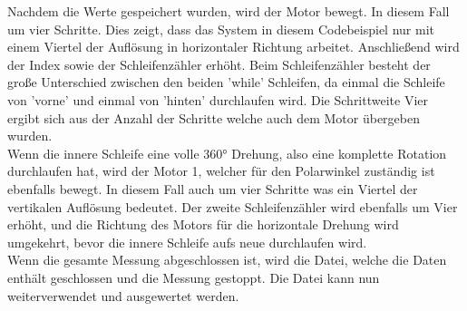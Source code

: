 Nachdem die Werte gespeichert wurden, wird der Motor bewegt. In diesem Fall um vier Schritte. Dies zeigt, dass das System in diesem Codebeispiel nur mit einem Viertel der Auflösung in horizontaler Richtung arbeitet. Anschließend wird der Index sowie der Schleifenzähler erhöht. Beim Schleifenzähler besteht der große Unterschied zwischen den beiden 'while' Schleifen, da einmal die Schleife von 'vorne' und einmal von 'hinten' durchlaufen wird. Die Schrittweite Vier ergibt sich aus der Anzahl der Schritte welche auch dem Motor übergeben wurden.\\
Wenn die innere Schleife eine volle 360° Drehung, also eine komplette Rotation durchlaufen hat, wird der Motor 1, welcher für den Polarwinkel zuständig ist ebenfalls bewegt. In diesem Fall auch um vier Schritte was ein Viertel der vertikalen Auflösung bedeutet. Der zweite Schleifenzähler wird ebenfalls um Vier erhöht, und die Richtung des Motors für die horizontale Drehung wird umgekehrt, bevor die innere Schleife aufs neue durchlaufen wird.\\
Wenn die gesamte Messung abgeschlossen ist, wird die Datei, welche die Daten enthält geschlossen und die Messung gestoppt. Die Datei kann nun weiterverwendet und ausgewertet werden.

